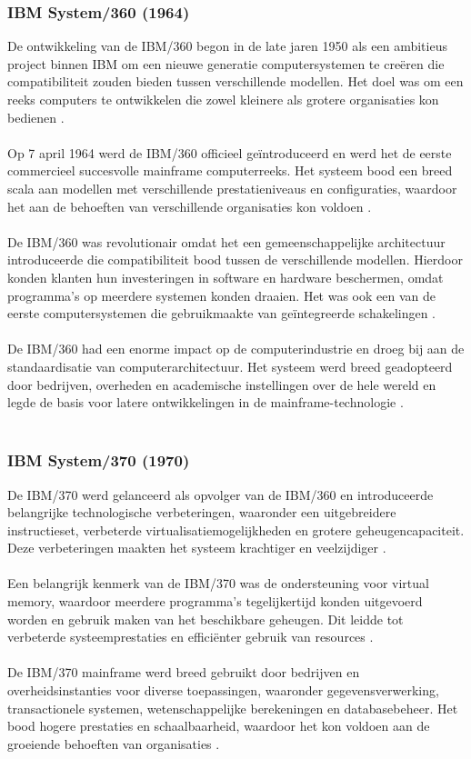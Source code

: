 \subsubsection{IBM System/360 (1964)}
De ontwikkeling van de IBM/360 begon in de late jaren 1950 als een ambitieus project binnen IBM om een nieuwe generatie computersystemen te creëren die compatibiliteit zouden bieden tussen verschillende modellen. Het doel was om een reeks computers te ontwikkelen die zowel kleinere als grotere organisaties kon bedienen \autocite{IBM2024b}.
\\ \\
Op 7 april 1964 werd de IBM/360 officieel geïntroduceerd en werd het de eerste commercieel succesvolle mainframe computerreeks. Het systeem bood een breed scala aan modellen met verschillende prestatieniveaus en configuraties, waardoor het aan de behoeften van verschillende organisaties kon voldoen \autocite{IBM2024b}.
\\ \\
De IBM/360 was revolutionair omdat het een gemeenschappelijke architectuur introduceerde die compatibiliteit bood tussen de verschillende modellen. Hierdoor konden klanten hun investeringen in software en hardware beschermen, omdat programma’s op meerdere systemen konden draaien. Het was ook een van de eerste computersystemen die gebruikmaakte van geïntegreerde schakelingen \autocite{IBM2024b}.
\\ \\
De IBM/360 had een enorme impact op de computerindustrie en droeg bij aan de standaardisatie van computerarchitectuur. Het systeem werd breed geadopteerd door bedrijven, overheden en academische instellingen over de hele wereld en legde de basis voor latere ontwikkelingen in de mainframe-technologie \autocite{IBM2024b}.
\\ \\
\subsubsection{IBM System/370 (1970)}
De IBM/370 werd gelanceerd als opvolger van de IBM/360 en introduceerde belangrijke technologische verbeteringen, waaronder een uitgebreidere instructieset, verbeterde virtualisatiemogelijkheden en grotere geheugencapaciteit. Deze verbeteringen maakten het systeem krachtiger en veelzijdiger \autocite{IBM2024c}.
\\ \\
Een belangrijk kenmerk van de IBM/370 was de ondersteuning voor virtual memory, waardoor meerdere programma’s tegelijkertijd konden uitgevoerd worden en gebruik maken van het beschikbare geheugen. Dit leidde tot verbeterde systeemprestaties en efficiënter gebruik van resources \autocite{IBM2024c}.
\\ \\
De IBM/370 mainframe werd breed gebruikt door bedrijven en overheidsinstanties voor diverse toepassingen, waaronder gegevensverwerking, transactionele systemen, wetenschappelijke berekeningen en databasebeheer. Het bood hogere prestaties en schaalbaarheid, waardoor het kon voldoen aan de groeiende behoeften van organisaties \autocite{IBM2024c}.
\\ \\
